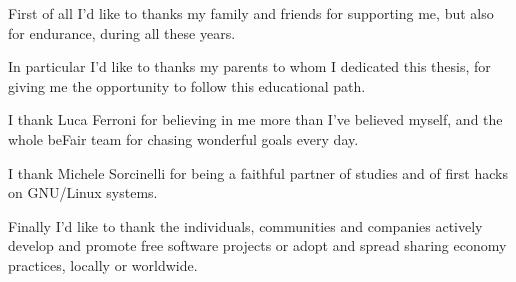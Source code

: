\documentclass[a4paper,twoside,11pt]{report}
\begin{document}

\copertinatesi
{}
\indice
\indicefigure
\indicetabelle
\iniziatesto









\appendix




\ringraziamenti
First of all I'd like to thanks my family and friends for supporting me, but also for endurance, during all these years.

In particular I'd like to thanks my parents to whom I dedicated this thesis, for giving me the opportunity to follow this educational path.

I thank Luca Ferroni for believing in me more than I've believed myself, and the whole beFair team for chasing wonderful goals every day.

I thank Michele Sorcinelli for being a faithful partner of studies and of first hacks on GNU/Linux systems.

Finally I'd like to thank the individuals, communities and companies actively develop and promote free software projects or adopt and spread sharing economy practices, locally or worldwide.
\end{document}

